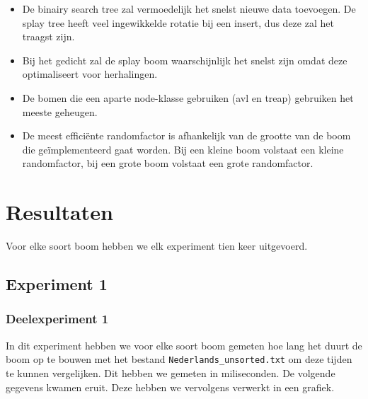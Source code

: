 \documentclass[a4paper,10pt]{article}
\begin{document}
\begin{itemize}
\item De binairy search tree zal vermoedelijk het snelst nieuwe data toevoegen. De splay tree heeft veel ingewikkelde rotatie bij een insert, dus deze zal het traagst zijn.
\item Bij het gedicht zal de splay boom waarschijnlijk het snelst zijn omdat deze optimaliseert voor herhalingen.
\item De bomen die een aparte node-klasse gebruiken (avl en treap) gebruiken het meeste geheugen.
\item De meest effici\"ente randomfactor is afhankelijk van de grootte van de boom die geïmplementeerd gaat worden. Bij een kleine boom volstaat een kleine randomfactor, bij een grote boom volstaat een grote randomfactor.
\end{itemize}

\section{Resultaten}
Voor elke soort boom hebben we elk experiment tien keer uitgevoerd.

\subsection{Experiment 1}
\subsubsection{Deelexperiment 1}
In dit experiment hebben we voor elke soort boom gemeten hoe lang het duurt de boom op te bouwen met het bestand  \texttt{Nederlands\_unsorted.txt} om deze tijden te kunnen vergelijken. Dit hebben we gemeten in miliseconden. De volgende gegevens kwamen eruit. Deze hebben we vervolgens verwerkt in een grafiek. \\

\end{document}
